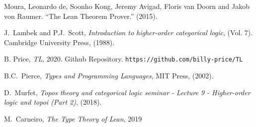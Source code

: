 \documentclass[12pt,leqno]{article}
\theoremstyle{example}
\numberwithin{equation}{section}
\begin{document}

\providecommand{\bysame}{\leavevmode\hbox to3em{\hrulefill}\thinspace}
\providecommand{\href}[2]{#2}
\begin{thebibliography}{9}

Moura, Leonardo de, Soonho Kong, Jeremy Avigad, Floris van Doorn and Jakob von Raumer. “The Lean Theorem Prover.” (2015).

J.~Lambek and P.J.~Scott, \textsl{Introduction to higher-order categorical logic}, (Vol. 7). Cambridge University Press, (1988).

B. Price, \textsl{TL}, 2020. Github Repository. \texttt{https://github.com/billy-price/TL}
 
B.C.~Pierce, \textsl{Types and Programming Languages}, MIT Press, (2002).

D.~Murfet, \textsl{Topos theory and categorical logic seminar - Lecture 9 - Higher-order logic and topoi (Part 2)}, (2018).

M.~Carneiro, \textsl{The Type Theory of Lean}, 2019

\end{thebibliography}
\end{document}
